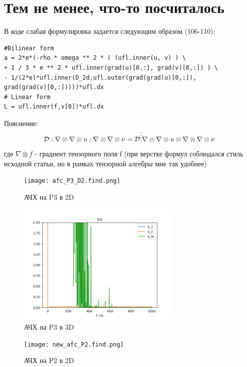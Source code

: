 \documentclass[a4paper,12pt]{article}
\begin{document}
\section{Тем не менее, что-то посчиталось}
В коде слабая формулировка задается следующим образом (106-110):
\begin{lstlisting}
#Bilinear form
a = 2*e*(-rho * omega ** 2 * ( (ufl.inner(u, v) ) \
+ 1 / 3 * e ** 2 * ufl.inner(grad(u)[0,:], grad(v)[0,:]) ) \
- 1/(2*e)*ufl.inner(D_2d,ufl.outer(grad(grad(u)[0,:]),
grad(grad(v)[0,:]))))*ufl.dx
# Linear form
L = ufl.inner(f,v[0])*ufl.dx
\end{lstlisting}

Пояснение: 
\begin{equation}
    \mathcal{D} : \nabla \otimes  \nabla \otimes u : \nabla \otimes \nabla \otimes \nu =\mathcal{D} \Shortstack{. . . .} \nabla \otimes \nabla \otimes u \otimes \nabla \otimes \nabla \otimes \nu 
\end{equation}
где $ \nabla \otimes f$ - градиент тензорного поля f (при верстке формул соблюдался стиль исходной статьи, но в рамках тензорной алгебры мне так удобнее)
\begin{figure}[H]
	\begin{center}
		\texttt{[image: afc\_P3\_D2.find.png]}
		\caption{АЧХ на P3 в 2D}
	\end{center}
\end{figure}

\begin{figure}[H]
	\begin{center}
		\includegraphics[width = 0.7\textwidth]{afc_P3_D3.png}
		\caption{АЧХ на P3 в 3D}
	\end{center}
\end{figure}

\begin{figure}[H]
	\begin{center}
		\texttt{[image: new\_afc\_P2.find.png]}
		\caption{АЧХ на P2 в 2D}
	\end{center}
\end{figure}
\end{document}
